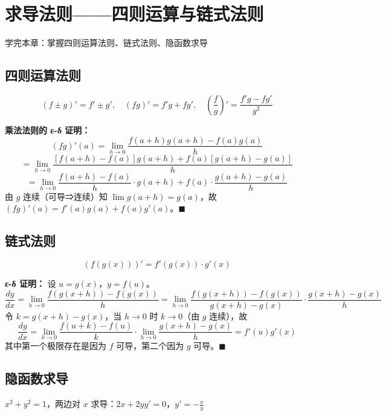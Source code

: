 \chapter{求导法则——四则运算与链式法则}
\begin{applicationbox}
学完本章：掌握四则运算法则、链式法则、隐函数求导
\end{applicationbox}

\section{四则运算法则}
\[(f\pm g)'=f'\pm g',\quad (fg)'=f'g+fg',\quad \left(\frac{f}{g}\right)'=\frac{f'g-fg'}{g^2}\]

\textbf{乘法法则的 ε-δ 证明：}
\[
(fg)'(a)=\lim_{h\to0}\frac{f(a+h)g(a+h)-f(a)g(a)}{h}
\]
\[
=\lim_{h\to0}\frac{[f(a+h)-f(a)]g(a+h)+f(a)[g(a+h)-g(a)]}{h}
\]
\[
=\lim_{h\to0}\frac{f(a+h)-f(a)}{h}\cdot g(a+h) + f(a)\cdot\frac{g(a+h)-g(a)}{h}
\]
由 \(g\) 连续（可导⇒连续）知 \(\lim g(a+h)=g(a)\)，故 \((fg)'(a)=f'(a)g(a)+f(a)g'(a)\)。\(\blacksquare\)

\section{链式法则}
\[(f(g(x)))' = f'(g(x))\cdot g'(x)\]

\textbf{ε-δ 证明：} 设 \(u=g(x)\)，\(y=f(u)\)。
\[
\frac{dy}{dx}=\lim_{h\to0}\frac{f(g(x+h))-f(g(x))}{h}
=\lim_{h\to0}\frac{f(g(x+h))-f(g(x))}{g(x+h)-g(x)}\cdot\frac{g(x+h)-g(x)}{h}
\]
令 \(k=g(x+h)-g(x)\)，当 \(h\to0\) 时 \(k\to0\)（由 \(g\) 连续），故
\[
\frac{dy}{dx}=\lim_{k\to0}\frac{f(u+k)-f(u)}{k}\cdot\lim_{h\to0}\frac{g(x+h)-g(x)}{h}=f'(u)g'(x)
\]
其中第一个极限存在是因为 \(f\) 可导，第二个因为 \(g\) 可导。\(\blacksquare\)

\section{隐函数求导}
\begin{examplebox}[3]
\(x^2+y^2=1\)，两边对 \(x\) 求导：\(2x+2yy'=0\)，\(y'=-\frac{x}{y}\)
\end{examplebox}

